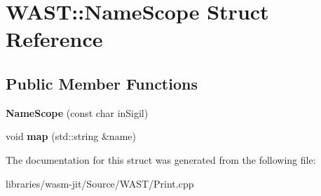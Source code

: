 \hypertarget{struct_w_a_s_t_1_1_name_scope}{}\section{W\+A\+ST\+:\+:Name\+Scope Struct Reference}
\label{struct_w_a_s_t_1_1_name_scope}
\subsection*{Public Member Functions}
\begin{DoxyCompactItemize}
\item 
\mbox{\label{struct_w_a_s_t_1_1_name_scope_a176f1590d90b4f1895ea471ecfca3492}} 
{\bfseries Name\+Scope} (const char in\+Sigil)
\item 
\mbox{\label{struct_w_a_s_t_1_1_name_scope_ab219e8195e1c1651618e417a4d684bec}} 
void {\bfseries map} (std\+::string \&name)
\end{DoxyCompactItemize}


The documentation for this struct was generated from the following file\+:\begin{DoxyCompactItemize}
\item 
libraries/wasm-\/jit/\+Source/\+W\+A\+S\+T/Print.\+cpp\end{DoxyCompactItemize}
